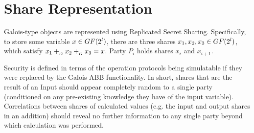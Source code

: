 \section{Share Representation}

Galois-type objects are represented using Replicated Secret Sharing.
Specifically, to store some variable $x \in GF(2^l)$,
there are three shares $x_1, x_2, x_3 \in GF(2^l)$,
which satisfy $x_1 +_{_G} x_2 +_{_G} x_3 = x$.
Party $P_i$ holds shares $x_i$ and $x_{i+1}$.

Security is defined in terms of the operation protocols being 
simulatable if they were replaced by the Galois ABB functionality.
In short, shares that are the result of an Input should appear
completely random to a single party (conditioned on any 
pre-existing knowledge they have of the input variable).
Correlations between shares of calculated values
(e.g. the input and output shares in an addition)
should reveal no further information to any single party beyond 
which calculation was performed.
